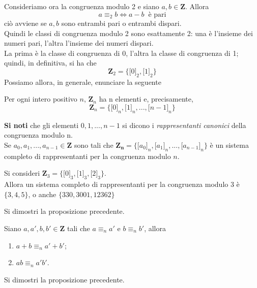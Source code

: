 \begin{flushleft}
\begin{esempio}
\end{esempio}
Consideriamo ora la congruenza modulo 2 e siano $a, b \in \mathbf{Z}$.
Allora
\[a\equiv_2 b \Leftrightarrow a-b\;\;\text{è pari}\]
ciò avviene se $a,b$ sono entrambi pari o entrambi dispari.\\
Quindi le classi di congruenza modulo 2 sono esattamente 2: una è l'insieme dei numeri pari, l'altra l'insieme dei numeri dispari.\\
La prima è la classe di congruenza di 0, l'altra la classe di congruenza di 1; quindi, in definitiva, si ha che
\[\mathbf{Z}_2 = \{\big[0\big]_2, \big[1\big]_2\}\]
Possiamo allora, in generale, enunciare la seguente
\begin{proposizione}
Per ogni intero positivo $n$, $\mathbf{Z}_n$ ha n elementi e, precisamente,
\[\mathbf{Z}_n =  \{\big[0\big]_n, \big[1\big]_n,...,\big[n-1\big]_n\}\]
\end{proposizione}
\textbf{Si noti} che gli elementi $0, 1,...,n-1$ si dicono i \textit{rappresentanti canonici} della congruenza modulo n.\\
Se $a_0, a_1,...,a_{n-1}\in \mathbf{Z}$ sono tali che $\mathbf{Z_n} = \{\big[a_0\big]_n, \big[a_1\big]_n,...,\big[a_{n-1}\big]_n\}$ è un sistema completo di rappresentanti per la congruenza modulo $n$.
\begin{esempio}

\end{esempio}
Si consideri $\mathbf{Z}_3 = \{\big[0\big]_3, \big[1\big]_3,\big[2\big]_3\}$.\\
Allora un sistema completo di rappresentanti per la congruenza modulo $3$ è $\{3, 4, 5\}$, o anche $\{330, 3001, 12362\}$




\begin{esercizio}
Si dimostri la proposizione precedente.
\end{esercizio}
\vspace{150px}

\begin{proposizione}
Siano $a, a', b, b'\in \mathbf{Z}$ tali che $a\equiv_n a'$ e $b\equiv_n b'$, allora
\begin{enumerate}
    \item $a+b \equiv_n a'+b'$;
    \item $ab \equiv_n a'b'$.
\end{enumerate}
\end{proposizione}
\begin{esercizio}
Si dimostri la proposizione precedente.
\end{esercizio}
\vspace{150px}


\end{flushleft}
